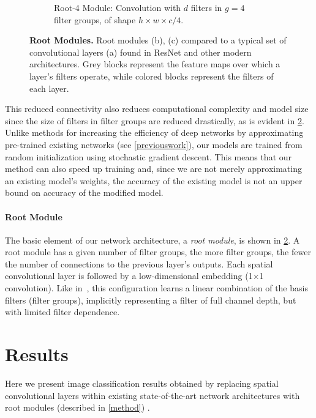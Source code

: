 \documentclass[thesis]{subfiles}
\begin{document}
\begin{figure}[tbp]
\begin{subfigure}[b]{0.95\textwidth}
			\caption{Root-4 Module: Convolution with $d$ filters in $g = 4$ filter groups, of shape $h\times w\times c/4$.}
			\label{fig:rootresnet4}
		\end{subfigure}
		\caption[Root modules: learning a channel basis for filters]{\textbf{Root Modules.} Root modules (b), (c) compared to a typical set of convolutional layers (a) found in ResNet and other modern architectures. Grey blocks represent the feature maps over which a layer's filters operate, while colored blocks represent the filters of each layer. 
		}
		\label{fig:rootmodule}
	\end{figure}
	This reduced connectivity also reduces computational complexity and model size since the size of filters in filter groups are reduced drastically, as is evident in \cref{fig:rootmodule}. Unlike methods for increasing the efficiency of deep networks by approximating pre-trained existing networks (see \cref{previouswork}), our models are trained from random initialization using stochastic gradient descent. This means that our method can also speed up training and, since we are not merely approximating an existing model's weights, the accuracy of the existing model is not an upper bound on accuracy of the modified model.
	
	\paragraph{Root Module}
	The basic element of our network architecture, a \emph{root module}, is shown in \cref{fig:rootmodule}. A root module has a given number of filter groups, the more filter groups, the fewer the number of connections to the previous layer's outputs. Each spatial convolutional layer is followed by a low-dimensional embedding (1$\times$1 convolution). Like in~\citep{Ioannou2016}, this configuration  learns a linear combination of the basis filters (filter groups), implicitly representing a filter of full channel depth, but with limited filter dependence.
	
	\section{Results}
	Here we present image classification results obtained by replacing spatial convolutional layers within existing state-of-the-art network architectures with root modules (described in \cref{method}) .
	
\end{document}
